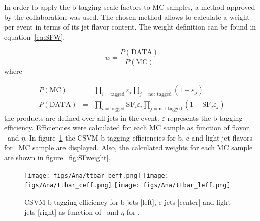 In order to apply the b-tagging scale factors to MC samples, a method approved by the collaboration was used. The chosen method allows to calculate a weight per event in terms of its jet flavor content. The weight definition can be found in equation~\ref{eq:SFW}, 

\begin{equation}
  \label{eq:SFW}
  w=\frac{P(\text{DATA})}{P(\text{MC})}
\end{equation}where

\begin{eqnarray}
  \label{eq:DataMCSFP}
  P(\text{MC}) & = & \prod_{i=\text{tagged}} \varepsilon_i \prod_{j=\text{not tagged}} (1-\varepsilon_j) \\
  P(\text{DATA}) & = & \prod_{i=\text{tagged}} \text{SF}_i \varepsilon_i \prod_{j=\text{not tagged}} (1-\text{SF}_j \varepsilon_j)
\end{eqnarray}the products are defined over all jets in the event. $\varepsilon$ represents the b-tagging efficiency. Efficiencies were calculated for each MC sample as function of flavor, \pt~and $\eta$. In figure~\ref{fig:ttbarBEff} the CSVM b-tagging efficiencies for b, c and light jet flavors for \ttbar~MC sample are displayed. Also, the calculated weights for each MC sample are shown in figure~\ref{fig:SFweight}. 


\begin{figure}[!Hhtbp]
  \begin{center}
    \texttt{[image: figs/Ana/ttbar\_beff.png]}
    \texttt{[image: figs/Ana/ttbar\_ceff.png]}
    \texttt{[image: figs/Ana/ttbar\_leff.png]}
    \caption{CSVM b-tagging efficiency for b-jets [left], c-jets [center] and light jets [right] as function of \pt~and $\eta$ for \ttbar.}
    \label{fig:ttbarBEff}
  \end{center}
\end{figure}

